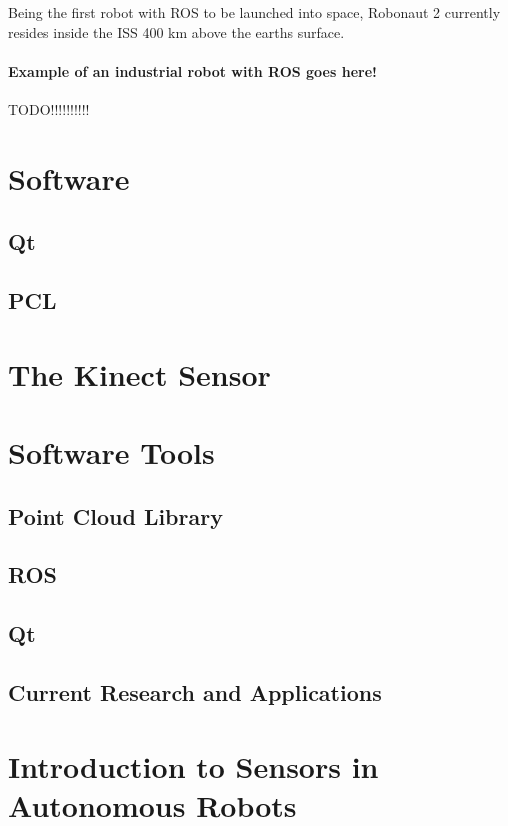 Being the first robot with \ac{ROS} to be launched into space, Robonaut 2 currently resides inside the \ac{ISS} 400 km above the earths surface.

\paragraph{Example of an industrial robot with ROS goes here!}

TODO!!!!!!!!!!

\section{Software}

\subsection{Qt}

\subsection{PCL}

\section{The Kinect Sensor}

\section{Software Tools}

\subsection{Point Cloud Library}

\subsection{ROS}

\subsection{Qt}


\subsection{Current Research and Applications}

\section{Introduction to Sensors in Autonomous Robots}

